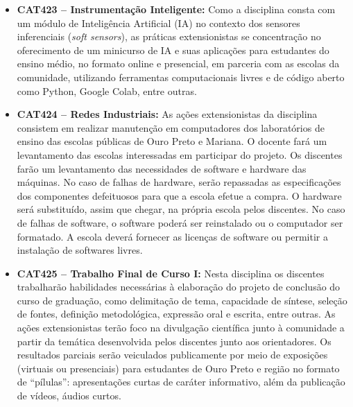 \documentclass[
	12pt,				%
	openright,			%
	oneside,			%
	a4paper,			%
	english,			%
	brazil				%
	]{abntex2}
\begin{document}
\begin{itemize}
    \item \textbf{CAT423 -- Instrumentação Inteligente:} Como a disciplina consta com um módulo de Inteligência Artificial (IA) no contexto dos sensores inferenciais (\textit{soft sensors}), as práticas extensionistas se concentração no oferecimento de um minicurso de IA e suas aplicações para estudantes do ensino médio, no formato online e presencial, em parceria com as escolas da comunidade, utilizando ferramentas computacionais livres e de código aberto como Python, Google Colab, entre outras.

    \item \textbf{CAT424 -- Redes Industriais:} As ações extensionistas da disciplina consistem em realizar manutenção em computadores dos laboratórios de ensino das escolas públicas de Ouro Preto e Mariana. O docente fará um levantamento das escolas interessadas em participar do projeto. Os discentes farão um levantamento das necessidades de software e hardware das máquinas. No caso de falhas de hardware, serão repassadas as especificações dos componentes defeituosos para que a escola efetue a compra. O hardware será substituído, assim que chegar, na própria escola pelos discentes. No caso de falhas de software, o software poderá ser reinstalado ou o computador ser formatado. A escola deverá fornecer as licenças de software ou permitir a instalação de softwares livres.

     \item \textbf{CAT425 -- Trabalho Final de Curso I:} Nesta disciplina os discentes trabalharão habilidades necessárias à elaboração do projeto de conclusão do curso de graduação, como delimitação de tema, capacidade de síntese, seleção de fontes, definição metodológica, expressão oral e escrita, entre outras. As ações extensionistas terão foco na divulgação científica junto à comunidade a partir da temática desenvolvida pelos discentes junto aos orientadores. Os resultados parciais serão veiculados publicamente por meio de exposições (virtuais ou presenciais) para estudantes de Ouro Preto e região no formato de ``pílulas'': apresentações curtas de caráter informativo, além da publicação de vídeos, áudios  curtos.


\end{itemize}
\end{document}
